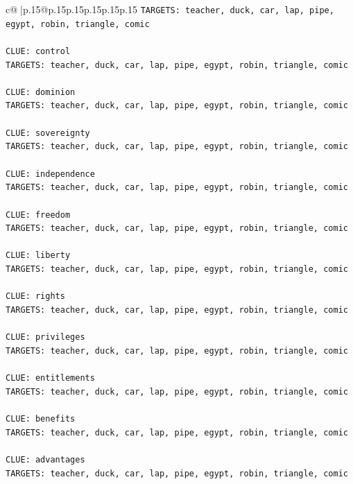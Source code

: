 \documentclass{article}
\begin{document}
{\begin{supertabular}{c@{$\;$}|p{.15\linewidth}@{}p{.15\linewidth}p{.15\linewidth}p{.15\linewidth}p{.15\linewidth}p{.15\linewidth}}
{{{\texttt{TARGETS: teacher, duck, car, lap, pipe, egypt, robin, triangle, comic} \\
\\ 
\texttt{CLUE: control} \\
\texttt{TARGETS: teacher, duck, car, lap, pipe, egypt, robin, triangle, comic} \\
\\ 
\texttt{CLUE: dominion} \\
\texttt{TARGETS: teacher, duck, car, lap, pipe, egypt, robin, triangle, comic} \\
\\ 
\texttt{CLUE: sovereignty} \\
\texttt{TARGETS: teacher, duck, car, lap, pipe, egypt, robin, triangle, comic} \\
\\ 
\texttt{CLUE: independence} \\
\texttt{TARGETS: teacher, duck, car, lap, pipe, egypt, robin, triangle, comic} \\
\\ 
\texttt{CLUE: freedom} \\
\texttt{TARGETS: teacher, duck, car, lap, pipe, egypt, robin, triangle, comic} \\
\\ 
\texttt{CLUE: liberty} \\
\texttt{TARGETS: teacher, duck, car, lap, pipe, egypt, robin, triangle, comic} \\
\\ 
\texttt{CLUE: rights} \\
\texttt{TARGETS: teacher, duck, car, lap, pipe, egypt, robin, triangle, comic} \\
\\ 
\texttt{CLUE: privileges} \\
\texttt{TARGETS: teacher, duck, car, lap, pipe, egypt, robin, triangle, comic} \\
\\ 
\texttt{CLUE: entitlements} \\
\texttt{TARGETS: teacher, duck, car, lap, pipe, egypt, robin, triangle, comic} \\
\\ 
\texttt{CLUE: benefits} \\
\texttt{TARGETS: teacher, duck, car, lap, pipe, egypt, robin, triangle, comic} \\
\\ 
\texttt{CLUE: advantages} \\
\texttt{TARGETS: teacher, duck, car, lap, pipe, egypt, robin, triangle, comic} \\
}}}
\end{supertabular}}
\end{document}
